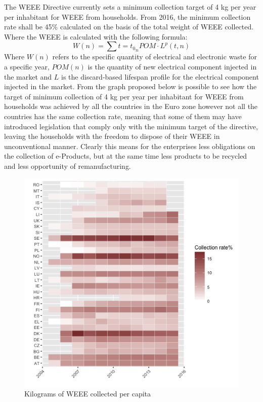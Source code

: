\documentclass{article}
\begin{document}
  The WEEE Directive currently sets a minimum collection target of 4 kg per year per inhabitant for WEEE from households. From 2016, the minimum collection rate shall be 45\% calculated on the basis of the total weight of WEEE collected. Where the WEEE is calculated with the following formula:
  $$
  W (n) = \sum{t = t_0}_{n} POM \cdot L^p(t,n)
  $$
  Where $W(n)$ refers to the specific quantity of electrical and electronic waste for a specific year, $POM(n)$ is the quantity of new electrical component injected in the market and $L$ is the discard-based lifespan profile for the electrical component injected in the market. From the graph proposed below is possible to see how the target of minimum collection of 4 kg per year per inhabitant for WEEE from households was achieved by all the countries in the Euro zone however not all the countries has the same collection rate, meaning that some of them may have introduced legislation that comply only with the minimum target of the directive, leaving the households with the freedom to dispose of their WEEE in unconventional manner. Clearly this means for the enterprises less obligations on the collection of e-Products, but at the same time less products to be recycled and less opportunity of remanufacturing.

  \begin{figure}
  \centering
  \includegraphics[width=0.8\linewidth]{Images/heatmap.png}
  \caption{Kilograms of WEEE collected per capita}
  \end{figure}
\end{document}
